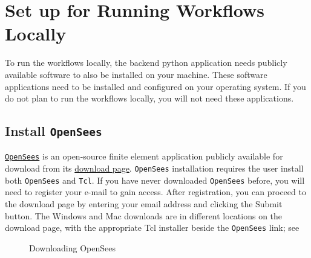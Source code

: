 \section{Set up for Running Workflows Locally}\label{setup}

To run the workflows locally, the backend python application needs
publicly available software to also be installed on your
machine. These software applications need to be installed and
configured on your operating system. If you do not plan to run the
workflows locally, you will not need these applications.

\subsection{Install \texttt{OpenSees}}

\href{http://opensees.berkeley.edu}{\texttt{OpenSees}} is an open-source finite element application publicly available for download from its \href{http://opensees.berkeley.edu/OpenSees/user/download.php}{download page}. \texttt{OpenSees} installation requires the user install both \texttt{OpenSees} and \texttt{Tcl}.  If you have never downloaded \texttt{OpenSees} before, you will need to register your e-mail to gain access. After registration, you can proceed to the download page by entering your email address and clicking the Submit button. The Windows and Mac downloads are in different locations on the download page, with the appropriate Tcl installer beside the \texttt{OpenSees} link; see 

\begin{figure}[!htbp]
  \caption{Downloading OpenSees}
  \label{fig:openseesDownload}
\end{figure}


